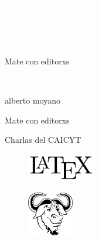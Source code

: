 \newpage
\thispagestyle{empty}
{\textcolor{white}{.}}

\newpage
\thispagestyle{empty}
{\textcolor{white}{.}}

\newpage
\thispagestyle{empty}
{\textcolor{white}{.}}

\vspace{30mm}

\begin{center}
	\LARGE{Mate con editorxs}
\end{center}

\newpage
\thispagestyle{empty}
{\textcolor{white}{.}}

\newpage
\thispagestyle{empty}
\begin{center}%
{\sc\large{alberto moyano}}\\ %
\end{center}

\vspace{30mm}

\begin{center}
\LARGE{Mate con editorxs}\\\vspace{10mm}

\Large{Charlas del CAICYT}
\end{center}

\vfill

\begin{figure}[b]
\centering
\includegraphics[width=30mm]{./media/logo-LaTeX.png}
\end{figure}

\newpage
\thispagestyle{empty}
\begin{figure}[t]
\centering
\vspace{-10mm}
\includegraphics[width=20mm]{./media/logo-GNU.png}\\
\end{figure}

